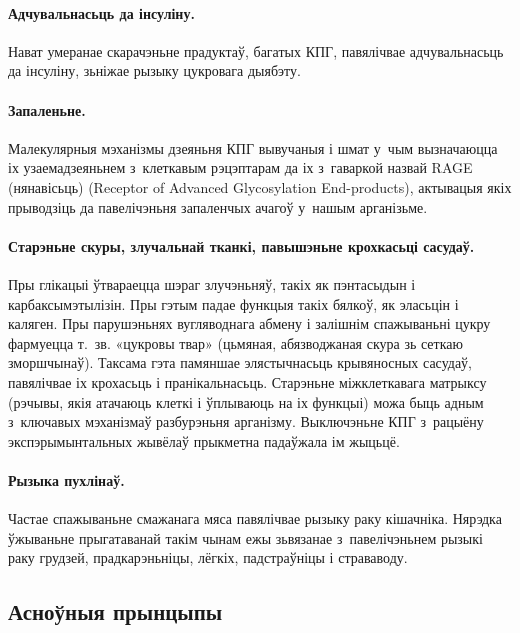 \paragraph{Адчувальнасьць да інсуліну.}
Нават умеранае скарачэньне прадуктаў, багатых КПГ, павялічвае адчувальнасьць да інсуліну, зьніжае рызыку цукровага дыябэту.

\paragraph{Запаленьне.}
Малекулярныя мэханізмы дзеяньня КПГ вывучаныя і шмат у~чым вызначаюцца іх узаемадзеяньнем з~клеткавым рэцэптарам да іх з~гаваркой назвай RAGE (нянавісьць) (Receptor of Advanced Glycosylation End-products), актывацыя якіх прыводзіць да павелічэньня запаленчых ачагоў у~нашым арганізьме.

\paragraph{Старэньне скуры, злучальнай тканкі, павышэньне крохкасьці сасудаў.}
Пры глікацыі ўтвараецца шэраг злучэньняў, такіх як пэнтасыдын і карбаксымэтылізін. Пры гэтым падае функцыя такіх бялкоў, як эласьцін і каляген. Пры парушэньнях вугляводнага абмену і залішнім спажываньні цукру фармуецца т.~зв. «цукровы твар» (цьмяная, абязводжаная скура зь сеткаю зморшчынаў). Таксама гэта памяншае элястычнасьць крывяносных сасудаў, павялічвае іх крохасьць і пранікальнасьць. Старэньне міжклеткавага матрыксу (рэчывы, якія атачаюць клеткі і ўплываюць на іх функцыі) можа быць адным з~ключавых мэханізмаў разбурэньня арганізму. Выключэньне КПГ з~рацыёну экспэрымынтальных жывёлаў прыкметна падаўжала ім жыцьцё.


\paragraph{Рызыка пухлінаў.}
Частае спажываньне смажанага мяса павялічвае рызыку раку кішачніка. Нярэдка ўжываньне прыгатаванай такім чынам ежы зьвязанае з~павелічэньнем рызыкі раку грудзей, прадкарэньніцы, лёгкіх, падстраўніцы і страваводу.

\subsection{Асноўныя прынцыпы}

